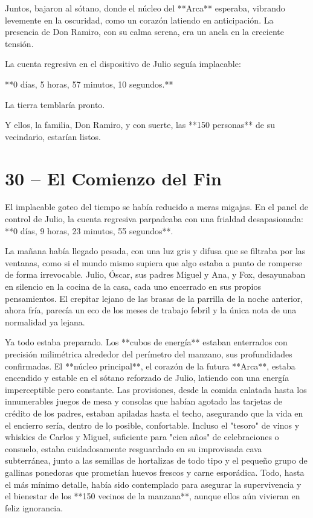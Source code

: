 \documentclass[a4paper,12pt]{book}
\begin{document}
Juntos, bajaron al sótano, donde el núcleo del **Arca** esperaba, vibrando levemente en la oscuridad, como un corazón latiendo en anticipación. La presencia de Don Ramiro, con su calma serena, era un ancla en la creciente tensión.

La cuenta regresiva en el dispositivo de Julio seguía implacable:

**0 días, 5 horas, 57 minutos, 10 segundos.**

La tierra temblaría pronto.

Y ellos, la familia, Don Ramiro, y con suerte, las **150 personas** de su vecindario, estarían listos.

\cleardoublepage %

\chapter*{30 – El Comienzo del Fin}

El implacable goteo del tiempo se había reducido a meras migajas. En el panel de control de Julio, la cuenta regresiva parpadeaba con una frialdad desapasionada: **0 días, 9 horas, 23 minutos, 55 segundos**.

La mañana había llegado pesada, con una luz gris y difusa que se filtraba por las ventanas, como si el mundo mismo supiera que algo estaba a punto de romperse de forma irrevocable. Julio, Óscar, sus padres Miguel y Ana, y Fox, desayunaban en silencio en la cocina de la casa, cada uno encerrado en sus propios pensamientos. El crepitar lejano de las brasas de la parrilla de la noche anterior, ahora fría, parecía un eco de los meses de trabajo febril y la única nota de una normalidad ya lejana.

Ya todo estaba preparado. Los **cubos de energía** estaban enterrados con precisión milimétrica alrededor del perímetro del manzano, sus profundidades confirmadas. El **núcleo principal**, el corazón de la futura **Arca**, estaba encendido y estable en el sótano reforzado de Julio, latiendo con una energía imperceptible pero constante. Las provisiones, desde la comida enlatada hasta los innumerables juegos de mesa y consolas que habían agotado las tarjetas de crédito de los padres, estaban apiladas hasta el techo, asegurando que la vida en el encierro sería, dentro de lo posible, confortable. Incluso el "tesoro" de vinos y whiskies de Carlos y Miguel, suficiente para "cien años" de celebraciones o consuelo, estaba cuidadosamente resguardado en su improvisada cava subterránea, junto a las semillas de hortalizas de todo tipo y el pequeño grupo de gallinas ponedoras que prometían huevos frescos y carne esporádica. Todo, hasta el más mínimo detalle, había sido contemplado para asegurar la supervivencia y el bienestar de los **150 vecinos de la manzana**, aunque ellos aún vivieran en feliz ignorancia.
\end{document}
